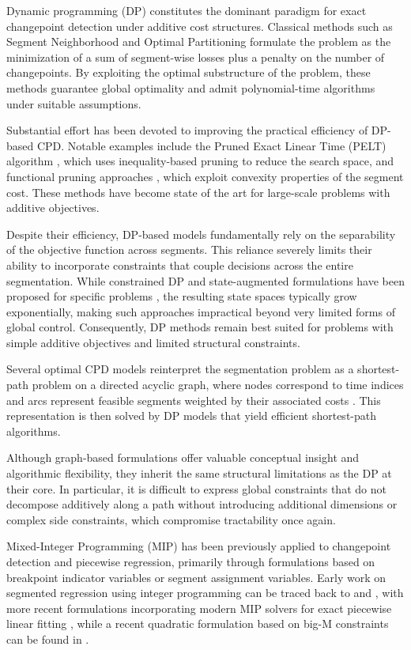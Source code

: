 \documentclass[preprints,article,submit,pdftex,moreauthors]{Definitions/mdpi}
\begin{document}
Dynamic programming (DP) constitutes the dominant paradigm for exact changepoint detection under additive cost structures. Classical methods such as Segment Neighborhood \cite{AL89} and Optimal Partitioning \cite{JSB05} formulate the problem as the minimization of a sum of segment-wise losses plus a penalty on the number of changepoints. By exploiting the optimal substructure of the problem, these methods guarantee global optimality and admit polynomial-time algorithms under suitable assumptions.

Substantial effort has been devoted to improving the practical efficiency of DP-based CPD. Notable examples include the Pruned Exact Linear Time (PELT) algorithm \cite{KFE12}, which uses inequality-based pruning to reduce the search space, and functional pruning approaches \cite{R10,J13}, which exploit convexity properties of the segment cost. These methods have become state of the art for large-scale problems with additive objectives.

Despite their efficiency, DP-based models fundamentally rely on the separability of the objective function across segments. This reliance severely limits their ability to incorporate constraints that couple decisions across the entire segmentation. While constrained DP and state-augmented formulations have been proposed for specific problems \cite{HRFB13}, the resulting state spaces typically grow exponentially, making such approaches impractical beyond very limited forms of global control. Consequently, DP methods remain best suited for problems with simple additive objectives and limited structural constraints.

Several optimal CPD models reinterpret the segmentation problem as a shortest-path problem on a directed acyclic graph, where nodes correspond to time indices and arcs represent feasible segments weighted by their associated costs \cite{B61,PC75}. This representation is then solved by DP models that yield efficient shortest-path algorithms.

Although graph-based formulations offer valuable conceptual insight and algorithmic flexibility, they inherit the same structural limitations as the DP at their core. In particular, it is difficult to express global constraints that do not decompose additively along a path without introducing additional dimensions or complex side constraints, which compromise tractability once again.

Mixed-Integer Programming (MIP) has been previously applied to changepoint detection and piecewise regression, primarily through formulations based on breakpoint indicator variables or segment assignment variables. Early work on segmented regression using integer programming can be traced back to \cite{H66} and \cite{F58}, with more recent formulations incorporating modern MIP solvers for exact piecewise linear fitting \cite{BKM16}, while a recent quadratic formulation based on big-M constraints can be found in \cite{PRSS25}.
\end{document}
